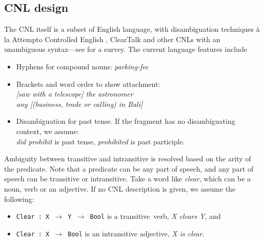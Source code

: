 \documentclass[11pt]{article}
\begin{document}
\subsection{CNL design}
\label{sec:cnlDesign}
The CNL itself is a subset of English language, with disambiguation techniques à la Attempto Controlled English \cite{fuchs_attempto_1996}, ClearTalk \cite{skuce2003controlled} and other CNLs with an unambiguous syntax---see \citet{kuhn2014survey} for a survey. The current language features include
\begin{itemize}
    \item Hyphens for compound nouns: \textit{parking-fee}
    \item Brackets and word order to show attachment: \\ 
            \textit{[saw with a telescope] the astronomer} \\ 
            \textit{any [(business, trade or calling) in Bali]}
    \item Disambiguation for past tense. If the fragment has no disambiguating context, we assume: \\
            \textit{did prohibit} is past tense, \textit{prohibited} is past participle. 
\end{itemize}

Ambiguity between transitive and intransitive is resolved based on the arity of the predicate. Note that a predicate can be any part of speech, and any part of speech can be transitive or intransitive.
    Take a word like \textit{clear}, which can be a noun, verb or an adjective. If no CNL description is given, we assume the following:
    \begin{itemize}
         \item \texttt{\small Clear~:~X $\rightarrow$ Y $\rightarrow$ Bool} is a transitive~verb, \textit{X clears Y}, and
         \item \texttt{\small Clear~:~X $\rightarrow$ Bool} is an intransitive adjective, \textit{X is clear}. 
         
    \end{itemize}
         
\end{document}

